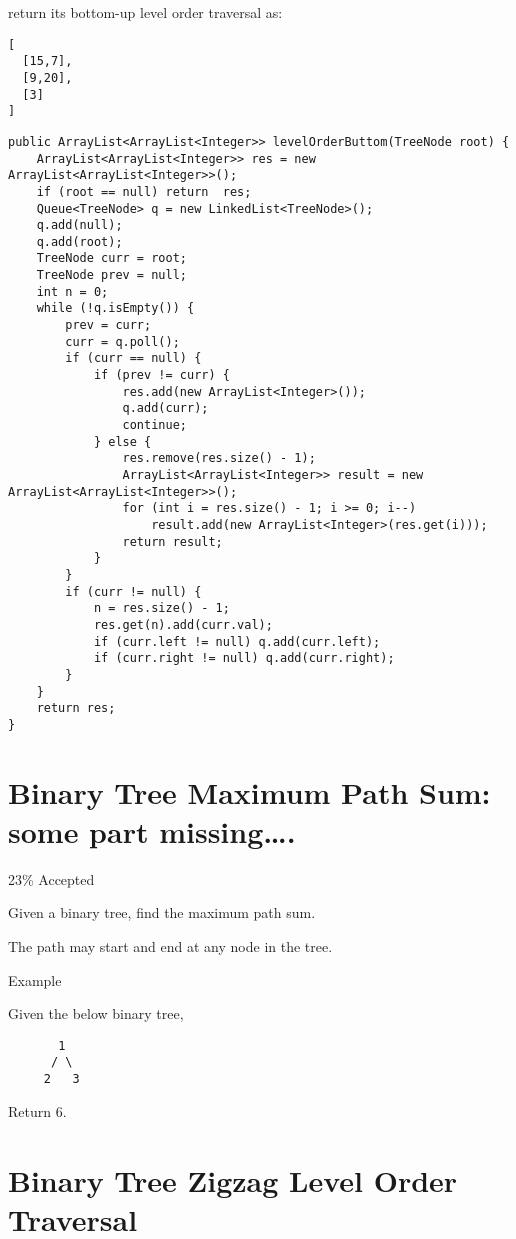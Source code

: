 \documentclass[9pt, b5paaper]{book}
\begin{document}
return its bottom-up level order traversal as:
\begin{verbatim}
[
  [15,7],
  [9,20],
  [3]
]
\end{verbatim}
\begin{verbatim}
public ArrayList<ArrayList<Integer>> levelOrderButtom(TreeNode root) {
    ArrayList<ArrayList<Integer>> res = new ArrayList<ArrayList<Integer>>();
    if (root == null) return  res;
    Queue<TreeNode> q = new LinkedList<TreeNode>();
    q.add(null);
    q.add(root);
    TreeNode curr = root;
    TreeNode prev = null;
    int n = 0;
    while (!q.isEmpty()) {
        prev = curr;
        curr = q.poll();
        if (curr == null) {
            if (prev != curr) {
                res.add(new ArrayList<Integer>());
                q.add(curr);
                continue;
            } else {
                res.remove(res.size() - 1);
                ArrayList<ArrayList<Integer>> result = new ArrayList<ArrayList<Integer>>();
                for (int i = res.size() - 1; i >= 0; i--) 
                    result.add(new ArrayList<Integer>(res.get(i)));
                return result;   
            }
        }
        if (curr != null) {
            n = res.size() - 1;
            res.get(n).add(curr.val);
            if (curr.left != null) q.add(curr.left);
            if (curr.right != null) q.add(curr.right);
        }
    }
    return res;
}
\end{verbatim}
\section{Binary Tree Maximum Path Sum: some part missing\ldots{}.}
\label{sec-5-19}

23\% Accepted

Given a binary tree, find the maximum path sum.

The path may start and end at any node in the tree.

Example

Given the below binary tree,
\begin{verbatim}
       1
      / \
     2   3
\end{verbatim}

Return 6.
\section{Binary Tree Zigzag Level Order Traversal}
\label{sec-5-20}
\end{document}
